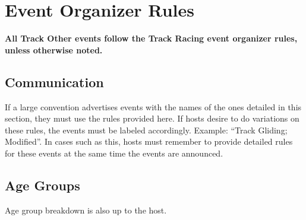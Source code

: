 \chapter{Event Organizer Rules}

\textbf{All Track Other events follow the Track Racing event organizer rules, unless otherwise noted.}

\section{Communication}

If a large convention advertises events with the names of the ones detailed in this section, they must use the rules provided here.
If hosts desire to do variations on these rules, the events must be labeled accordingly.
Example: ``Track Gliding; Modified''.
In cases such as this, hosts must remember to provide detailed rules for these events at the same time the events are announced.

\section{Age Groups}

Age group breakdown is also up to the host.
